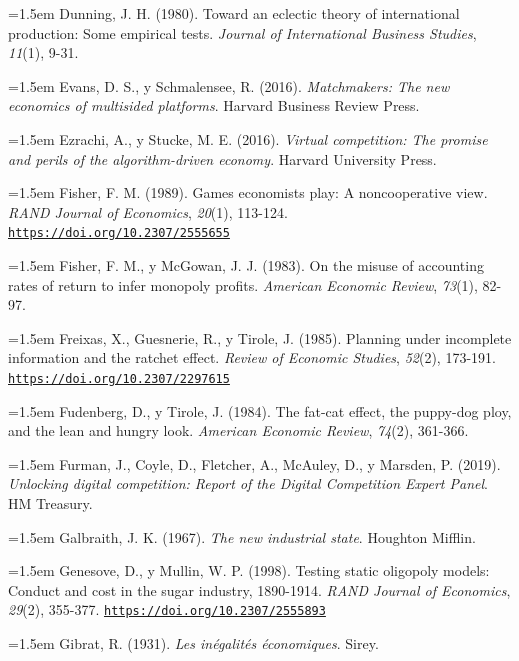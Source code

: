 \documentclass[10pt,a4paper]{article}
\begin{document}
\noindent\hangindent=1.5em Dunning, J. H. (1980). Toward an eclectic theory of international production: Some empirical tests. \textit{Journal of International Business Studies}, \textit{11}(1), 9-31.

\noindent\hangindent=1.5em Evans, D. S., y Schmalensee, R. (2016). \textit{Matchmakers: The new economics of multisided platforms}. Harvard Business Review Press.

\noindent\hangindent=1.5em Ezrachi, A., y Stucke, M. E. (2016). \textit{Virtual competition: The promise and perils of the algorithm-driven economy}. Harvard University Press.

\noindent\hangindent=1.5em Fisher, F. M. (1989). Games economists play: A noncooperative view. \textit{RAND Journal of Economics}, \textit{20}(1), 113-124. \href{https://doi.org/10.2307/2555655}{\nolinkurl{https://doi.org/10.2307/2555655}}

\noindent\hangindent=1.5em Fisher, F. M., y McGowan, J. J. (1983). On the misuse of accounting rates of return to infer monopoly profits. \textit{American Economic Review}, \textit{73}(1), 82-97.

\noindent\hangindent=1.5em Freixas, X., Guesnerie, R., y Tirole, J. (1985). Planning under incomplete information and the ratchet effect. \textit{Review of Economic Studies}, \textit{52}(2), 173-191. \href{https://doi.org/10.2307/2297615}{\nolinkurl{https://doi.org/10.2307/2297615}}

\noindent\hangindent=1.5em Fudenberg, D., y Tirole, J. (1984). The fat-cat effect, the puppy-dog ploy, and the lean and hungry look. \textit{American Economic Review}, \textit{74}(2), 361-366.

\noindent\hangindent=1.5em Furman, J., Coyle, D., Fletcher, A., McAuley, D., y Marsden, P. (2019). \textit{Unlocking digital competition: Report of the Digital Competition Expert Panel}. HM Treasury.

\noindent\hangindent=1.5em Galbraith, J. K. (1967). \textit{The new industrial state}. Houghton Mifflin.

\noindent\hangindent=1.5em Genesove, D., y Mullin, W. P. (1998). Testing static oligopoly models: Conduct and cost in the sugar industry, 1890-1914. \textit{RAND Journal of Economics}, \textit{29}(2), 355-377. \href{https://doi.org/10.2307/2555893}{\nolinkurl{https://doi.org/10.2307/2555893}}

\noindent\hangindent=1.5em Gibrat, R. (1931). \textit{Les inégalités économiques}. Sirey.
\end{document}
